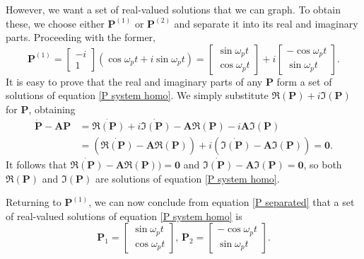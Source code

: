\documentclass{article}
\begin{document}
However, we want a set of real-valued solutions that we can graph. To obtain these, we choose either $\mathbf{P}^{(1)}$ or $\mathbf{P}^{(2)}$ and separate it into its real and imaginary parts. Proceeding with the former,
\begin{equation}\label{P separated}
    \mathbf{P}^{(1)} = 
    \begin{bmatrix}
        -i \\ 1
    \end{bmatrix}
    (\cos{\omega_p t} + i\sin{\omega_p t}) =
    \begin{bmatrix}
        \sin{\omega_p t} \\ \cos{\omega_p t}
    \end{bmatrix} +
    i\begin{bmatrix}
        -\cos{\omega_p t} \\ \sin{\omega_p t}
    \end{bmatrix}\text{.}
\end{equation}
It is easy to prove that the real and imaginary parts of any $\mathbf{P}$ form a set of solutions of equation \ref{P system homo}. We simply substitute $\pmb{\Re}(\mathbf{P}) + i\pmb{\Im}(\mathbf{P})$ for $\mathbf{P}$, obtaining
\begin{equation}
    \begin{split}
        \mathbf{\dot{P}} - \mathbf{AP} &= \mathbf{\dot{\pmb{\Re}(P)}} + i\mathbf{\dot{\pmb{\Im}(P)}} - \mathbf{A}\pmb{\Re}(\mathbf{P}) - i\mathbf{A}\pmb{\Im}(\mathbf{P}) \\
        &= (\mathbf{\dot{\pmb{\Re}(P)}} - \mathbf{A}\pmb{\Re}(\mathbf{P})) + i(\mathbf{\dot{\pmb{\Im}(P)}} - \mathbf{A}\pmb{\Im}(\mathbf{P})) = \mathbf{0}\text{.}
    \end{split}
\end{equation}
It follows that $\mathbf{\dot{\pmb{\Re}(P)}} - \mathbf{A}\pmb{\Re}(\mathbf{P})) = \mathbf{0}$ and $\mathbf{\dot{\pmb{\Im}(P)}} - \mathbf{A}\pmb{\Im}(\mathbf{P}) = \mathbf{0}$, so both $\pmb{\Re}(\mathbf{P})$ and $\pmb{\Im}(\mathbf{P})$ are solutions of equation \ref{P system homo}.

Returning to $\mathbf{P}^{(1)}$, we can now conclude from equation \ref{P separated} that a set of real-valued solutions of equation \ref{P system homo} is
\begin{equation}\label{general homo}
    \mathbf{P}_1 = 
    \begin{bmatrix}
        \sin{\omega_p t} \\ \cos{\omega_p t}
    \end{bmatrix}\text{, }
    \mathbf{P}_2 = 
    \begin{bmatrix}
        -\cos{\omega_p t} \\ \sin{\omega_p t}
    \end{bmatrix}\text{.}
\end{equation}
\end{document}
